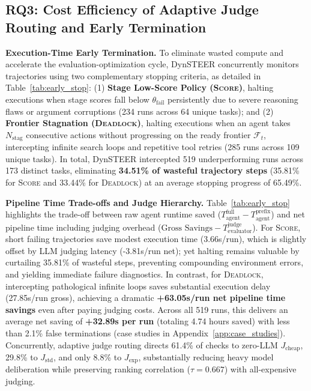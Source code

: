 \subsection{RQ3: Cost Efficiency of Adaptive Judge Routing and Early Termination}
\label{sec:exp_rq3}



\textbf{Execution-Time Early Termination.} To eliminate wasted compute and accelerate the evaluation-optimization cycle, DynSTEER concurrently monitors trajectories using two complementary stopping criteria, as detailed in Table~\ref{tab:early_stop}: (1) \textbf{Stage Low-Score Policy (\textsc{Score})}, halting executions when stage scores fall below $\theta_{\text{fail}}$ persistently due to severe reasoning flaws or argument corruptions (234 runs across 64 unique tasks); and (2) \textbf{Frontier Stagnation (\textsc{Deadlock})}, halting executions when an agent takes $N_{\text{stag}}$ consecutive actions without progressing on the ready frontier $\mathcal{F}_t$, intercepting infinite search loops and repetitive tool retries (285 runs across 109 unique tasks). In total, DynSTEER intercepted 519 underperforming runs across 173 distinct tasks, eliminating \textbf{34.51\% of wasteful trajectory steps} (35.81\% for \textsc{Score} and 33.44\% for \textsc{Deadlock}) at an average stopping progress of 65.49\%.

\textbf{Pipeline Time Trade-offs and Judge Hierarchy.} Table~\ref{tab:early_stop} highlights the trade-off between raw agent runtime saved ($T_{\text{agent}}^{\text{full}} - T_{\text{agent}}^{\text{prefix}}$) and net pipeline time including judging overhead ($\text{Gross Savings} - T_{\text{evaluator}}^{\text{judge}}$). For \textsc{Score}, short failing trajectories save modest execution time (3.66s/run), which is slightly offset by LLM judging latency (-3.81s/run net); yet halting remains valuable by curtailing 35.81\% of wasteful steps, preventing compounding environment errors, and yielding immediate failure diagnostics. In contrast, for \textsc{Deadlock}, intercepting pathological infinite loops saves substantial execution delay (27.85s/run gross), achieving a dramatic \textbf{+63.05s/run net pipeline time savings} even after paying judging costs. Across all 519 runs, this delivers an average net saving of \textbf{+32.89s per run} (totaling 4.74 hours saved) with less than 2.1\% false terminations (case studies in Appendix~\ref{app:case_studies}). Concurrently, adaptive judge routing directs 61.4\% of checks to zero-LLM $J_{\text{cheap}}$, 29.8\% to $J_{\text{std}}$, and only 8.8\% to $J_{\text{exp}}$, substantially reducing heavy model deliberation while preserving ranking correlation ($\tau = 0.667$) with all-expensive judging.